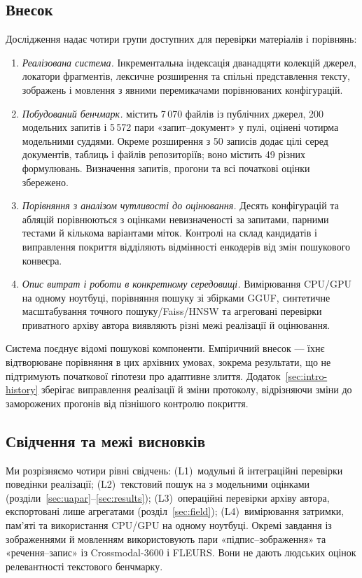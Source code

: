 \subsection{Внесок}
Дослідження надає чотири групи доступних для перевірки матеріалів і порівнянь:
\begin{enumerate}[label=(\alph*)]
\item \emph{Реалізована система.} Інкрементальна індексація дванадцяти колекцій джерел, локатори фрагментів, лексичне розширення та спільні представлення тексту, зображень і мовлення з явними перемикачами порівнюваних конфігурацій.
\item \emph{Побудований бенчмарк.} \uapar{} містить 7\,070 файлів із публічних джерел, 200 модельних запитів і 5\,572 пари «запит--документ» у пулі, оцінені чотирма модельними суддями. Окреме розширення з 50 записів додає цілі серед документів, таблиць і файлів репозиторіїв; воно містить 49 різних формулювань. Визначення запитів, прогони та всі початкові оцінки збережено.
\item \emph{Порівняння з аналізом чутливості до оцінювання.} Десять конфігурацій та абляцій порівнюються з оцінками невизначеності за запитами, парними тестами й кількома варіантами міток. Контролі на склад кандидатів і виправлення покриття відділяють відмінності енкодерів від змін пошукового конвеєра.
\item \emph{Опис витрат і роботи в конкретному середовищі.} Вимірювання CPU/GPU на одному ноутбуці, порівняння пошуку зі збірками GGUF, синтетичне масштабування точного пошуку/Faiss/HNSW та агреговані перевірки приватного архіву автора виявляють різні межі реалізації й оцінювання.
\end{enumerate}
Система поєднує відомі пошукові компоненти. Емпіричний внесок --- їхнє відтворюване порівняння в цих архівних умовах, зокрема результати, що не підтримують початкової гіпотези про адаптивне злиття. Додаток~\ref{sec:intro-history} зберігає виправлення реалізації й зміни протоколу, відрізняючи зміни до заморожених прогонів від пізнішого контролю покриття.

\subsection{Свідчення та межі висновків}
Ми розрізняємо чотири рівні свідчень:
(L1)~модульні й інтеграційні перевірки поведінки реалізації;
(L2)~текстовий пошук на \uapar{} з модельними оцінками (розділи~\ref{sec:uapar}--\ref{sec:results});
(L3)~операційні перевірки архіву автора, експортовані лише агрегатами (розділ~\ref{sec:field});
(L4)~вимірювання затримки, пам'яті та використання CPU/GPU на одному ноутбуці.
Окремі завдання із зображеннями й мовленням використовують пари «підпис--зображення» та «речення--запис» із Crossmodal-3600 і FLEURS. Вони не дають людських оцінок релевантності текстового бенчмарку.


